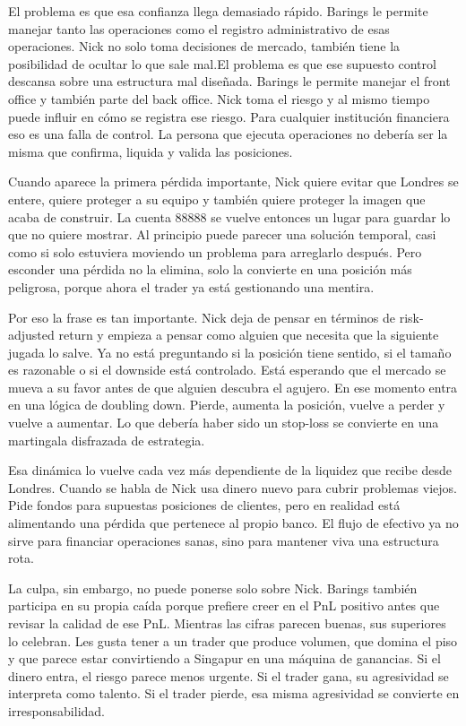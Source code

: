 El problema es que esa confianza llega demasiado rápido. Barings le permite manejar tanto las operaciones como el registro administrativo de esas operaciones. Nick no solo toma decisiones de mercado, también tiene la posibilidad de ocultar lo que sale mal.El problema es que ese supuesto control descansa sobre una estructura mal diseñada. Barings le permite manejar el front office y también parte del back office. Nick toma el riesgo y al mismo tiempo puede influir en cómo se registra ese riesgo. Para cualquier institución financiera eso es una falla de control. La persona que ejecuta operaciones no debería ser la misma que confirma, liquida y valida las posiciones. 

Cuando aparece la primera pérdida importante, Nick quiere evitar que Londres se entere, quiere proteger a su equipo y también quiere proteger la imagen que acaba de construir. La cuenta 88888 se vuelve entonces un lugar para guardar lo que no quiere mostrar. Al principio puede parecer una solución temporal, casi como si solo estuviera moviendo un problema para arreglarlo después. Pero esconder una pérdida no la elimina, solo la convierte en una posición más peligrosa, porque ahora el trader ya está gestionando una mentira.

Por eso la frase  es tan importante. Nick deja de pensar en términos de risk-adjusted return y empieza a pensar como alguien que necesita que la siguiente jugada lo salve. Ya no está preguntando si la posición tiene sentido, si el tamaño es razonable o si el downside está controlado. Está esperando que el mercado se mueva a su favor antes de que alguien descubra el agujero. En ese momento entra en una lógica de doubling down. Pierde, aumenta la posición, vuelve a perder y vuelve a aumentar. Lo que debería haber sido un stop-loss se convierte en una martingala disfrazada de estrategia.

Esa dinámica lo vuelve cada vez más dependiente de la liquidez que recibe desde Londres. Cuando se habla de  Nick usa dinero nuevo para cubrir problemas viejos. Pide fondos para supuestas posiciones de clientes, pero en realidad está alimentando una pérdida que pertenece al propio banco. El flujo de efectivo ya no sirve para financiar operaciones sanas, sino para mantener viva una estructura rota. 

La culpa, sin embargo, no puede ponerse solo sobre Nick. Barings también participa en su propia caída porque prefiere creer en el PnL positivo antes que revisar la calidad de ese PnL. Mientras las cifras parecen buenas, sus superiores lo celebran. Les gusta tener a un trader que produce volumen, que domina el piso y que parece estar convirtiendo a Singapur en una máquina de ganancias. Si el dinero entra, el riesgo parece menos urgente. Si el trader gana, su agresividad se interpreta como talento. Si el trader pierde, esa misma agresividad se convierte en irresponsabilidad.

